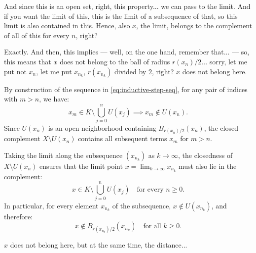 \begin{proofWrapper}
\begin{speech}[00:04:47 - 00:06:15]
And since this is an open set, right, this property... we can pass to the limit. And if you want the limit of this, this is the limit of a subsequence of that, so this limit is also contained in this. Hence, also $x$, the limit, belongs to the complement of all of this for every $n$, right?

Exactly. And then, this implies --- well, on the one hand, remember that... --- so, this means that $x$ does not belong to the ball of radius $r(x_n)/2$... sorry, let me put not $x_n$, let me put $x_{n_k}$, $r(x_{n_k})$ divided by $2$, right?  $x$ does not belong here.
\end{speech}

\begin{content}
By construction of the sequence in \eqref{eq:inductive-step-seq}, for any pair of indices with $m > n$, we have:
\begin{equation}\label{eq:separation-points}
x_m \in K \setminus \bigcup_{j=0}^n U(x_j) \implies x_m \notin U(x_n).
\end{equation}
Since $U(x_n)$ is an open neighborhood containing $B_{r(x_n)/2}(x_n)$, the closed complement $X \setminus U(x_n)$ contains all subsequent terms $x_m$ for $m > n$.

Taking the limit along the subsequence $(x_{n_k})$ as $k \to \infty$, the closedness of $X \setminus U(x_n)$ ensures that the limit point $x = \lim_{k \to \infty} x_{n_k}$ must also lie in the complement:
\[
x \in K \setminus \bigcup_{j=0}^n U(x_j) \quad \text{for every } n \ge 0.
\]
In particular, for every element $x_{n_k}$ of the subsequence, $x \notin U(x_{n_k})$, and therefore:
\begin{equation}\label{eq:limit-outside-ball}
x \notin B_{r(x_{n_k})/2}(x_{n_k}) \quad \text{for all } k \ge 0.
\end{equation}
\end{content}

\begin{hidden}
\end{hidden}

\begin{speech}[00:06:15 - 00:07:35]
$x$ does not belong here, but at the same time, the distance...


\end{speech}
\end{proofWrapper}
